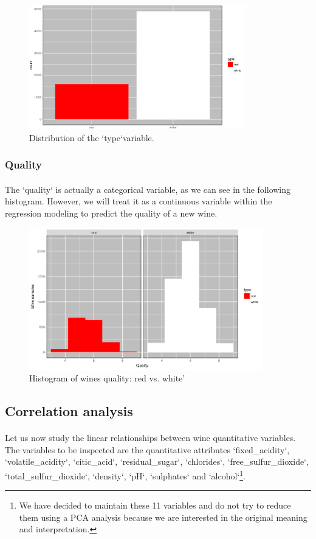 \documentclass[10pt]{article}
\begin{document}
\begin{figure}[H]
	\centering
	\includegraphics[width=3.7in]{figures/type-distribution.png}
	\caption{Distribution of the `type`variable.} 
	\label{figure:type}
\end{figure}

\subsubsection{Quality}
\paragraph*{}
The `quality` is actually a categorical variable, as we can see in the following histogram. However, we will treat it as a continuous variable within the regression modeling to predict the quality of a new wine.

\begin{figure}[H]
	\centering
	\includegraphics[width=4in]{figures/quality-distribution.png}
	\caption{Histogram of wines quality: red vs. white'} 
	\label{figure:quality}
\end{figure}

\subsection{Correlation analysis}

\paragraph*{}
Let us now study the linear relationships between wine quantitative variables. The variables to be inspected are the quantitative attributes `fixed\_acidity`, `volatile\_acidity`, `citic\_acid`, `residual\_sugar`, `chlorides`, `free\_sulfur\_dioxide`, `total\_sulfur\_dioxide`, `density`, `pH`, `sulphates` and `alcohol`\footnote{We have decided to maintain these 11 variables and do not try to reduce them using a PCA analysis because we are interested in the original meaning and interpretation.}. 
\end{document}
